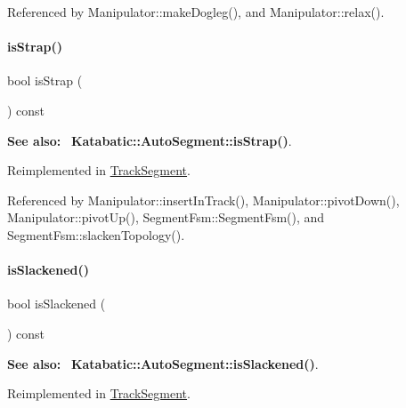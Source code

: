 Referenced by Manipulator\+::make\+Dogleg(), and Manipulator\+::relax().

\mbox{\label{classKite_1_1TrackElement_a62d61c231cf404a814ae37665fa8164f}} 
\paragraph{\texorpdfstring{is\+Strap()}{isStrap()}}
{\footnotesize\ttfamily bool is\+Strap (\begin{DoxyParamCaption}{ }\end{DoxyParamCaption}) const\hspace{0.3cm}{\ttfamily [virtual]}}

{\bfseries See also\+:}~ \textbf{ Katabatic\+::\+Auto\+Segment\+::is\+Strap()}. 

Reimplemented in \mbox{\hyperlink{classKite_1_1TrackSegment_a62d61c231cf404a814ae37665fa8164f}{Track\+Segment}}.



Referenced by Manipulator\+::insert\+In\+Track(), Manipulator\+::pivot\+Down(), Manipulator\+::pivot\+Up(), Segment\+Fsm\+::\+Segment\+Fsm(), and Segment\+Fsm\+::slacken\+Topology().

\mbox{\label{classKite_1_1TrackElement_a782cff57d3fe10e758d19ee65a06643d}} 
\paragraph{\texorpdfstring{is\+Slackened()}{isSlackened()}}
{\footnotesize\ttfamily bool is\+Slackened (\begin{DoxyParamCaption}{ }\end{DoxyParamCaption}) const\hspace{0.3cm}{\ttfamily [virtual]}}

{\bfseries See also\+:}~ \textbf{ Katabatic\+::\+Auto\+Segment\+::is\+Slackened()}. 

Reimplemented in \mbox{\hyperlink{classKite_1_1TrackSegment_a782cff57d3fe10e758d19ee65a06643d}{Track\+Segment}}.

